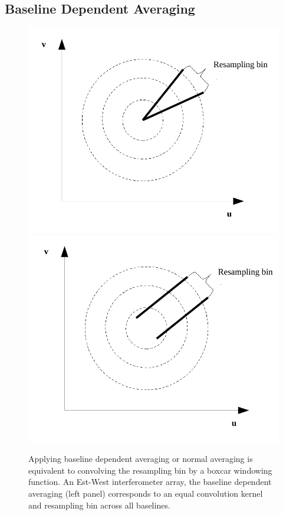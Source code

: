 \documentclass[useAMS,usenatbib]{mn2e}
\begin{document}
\subsection{Baseline Dependent Averaging}
\label{sec:bda}
\begin{figure}
\includegraphics[width=\columnwidth]{./Figures/BDA_design_resamplin_bin_avg.pdf}
\includegraphics[width=\columnwidth]{./Figures/BDA_design_resamplin_bin_bda.pdf}
\caption{Applying baseline dependent averaging or normal averaging is equivalent to convolving the 
resampling bin by a boxcar windowing function. An Est-West interferometer array, the baseline dependent averaging  (left panel)
 corresponds to an equal convolution kernel and resampling bin across all baselines.}\label{fig:tipical-normalav_bda}
\end{figure}
\end{document}
